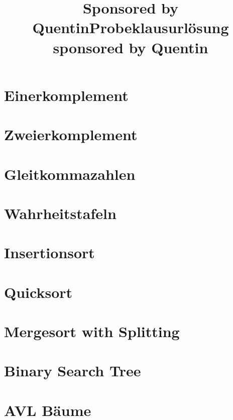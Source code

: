 \documentclass{article}
\title{Sponsored by Quentin}
\title{Probeklausurlösung sponsored by Quentin}
\begin{document}
\maketitle
\section{Einerkomplement}




\section{Zweierkomplement}




\section{Gleitkommazahlen}




\section{Wahrheitstafeln}


\pagebreak
\section{Insertionsort}


\section{Quicksort}

\pagebreak
\section{Mergesort with Splitting}

\pagebreak
\section{Binary Search Tree}

\section{AVL Bäume}

\pagebreak
\end{document}
